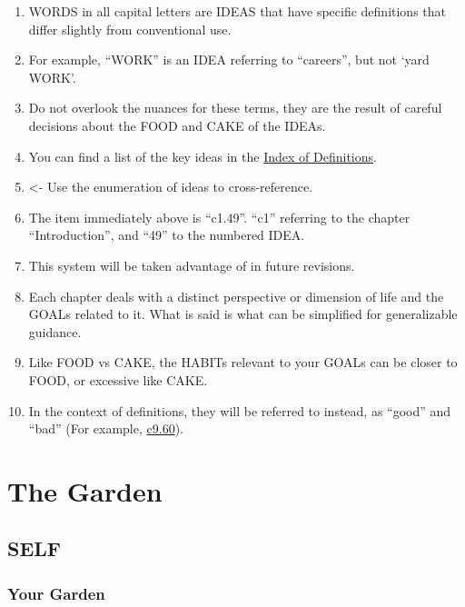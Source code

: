 \documentclass[
]{book}
\providecommand{\tightlist}{%
  \setlength{\itemsep}{0pt}\setlength{\parskip}{0pt}}
\begin{document}
\begin{enumerate}
\def\labelenumi{\arabic{enumi}.}
\setcounter{enumi}{44}
\tightlist
\item
  WORDS in all capital letters are IDEAS that have specific definitions that differ
  slightly from conventional use.
\item
  For example, ``WORK'' is an IDEA referring to ``careers'', but not `yard WORK'.
\item
  Do not overlook the nuances for these terms, they are the result of careful decisions about the FOOD and CAKE of the IDEAs.
\item
  You can find a list of the key ideas in the \protect\hyperlink{index-of-definitions}{Index of Definitions}.
\item
  \textless- Use the enumeration of ideas to cross-reference.
\item
  The item immediately above is ``c1.49''. ``c1'' referring to the chapter ``Introduction'', and ``49'' to the numbered IDEA.
\item
  This system will be taken advantage of in future revisions.
\item
  Each chapter deals with a distinct perspective or dimension of life and the GOALs related to it. What is said is what can be simplified for generalizable guidance.
\item
  Like FOOD vs CAKE, the HABITs relevant to your GOALs can be closer to FOOD, or excessive like CAKE.
\item
  In the context of definitions, they will be referred to instead, as ``good'' and ``bad'' (For example, \protect\hyperlink{pris-differ}{c9.60}).
\end{enumerate}

\hypertarget{part-the-garden}{%
\part{The Garden}\label{part-the-garden}}

\hypertarget{self}{%
\chapter{SELF}\label{self}}

\hypertarget{your-garden}{%
\section{Your Garden}\label{your-garden}}
\end{document}
